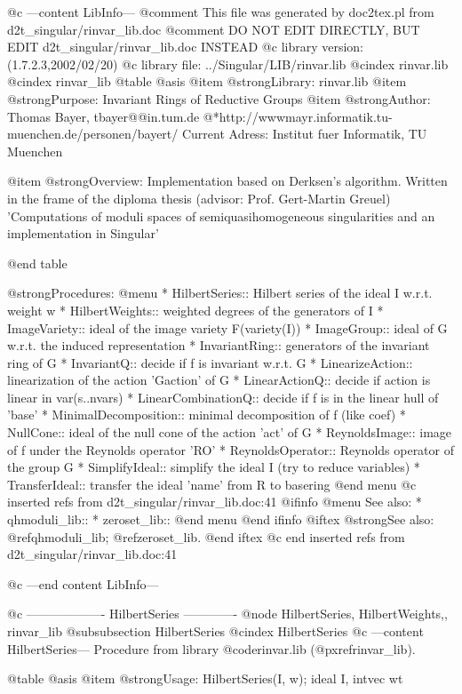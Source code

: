 @c ---content LibInfo---
@comment This file was generated by doc2tex.pl from d2t_singular/rinvar_lib.doc
@comment DO NOT EDIT DIRECTLY, BUT EDIT d2t_singular/rinvar_lib.doc INSTEAD
@c library version: (1.7.2.3,2002/02/20)
@c library file: ../Singular/LIB/rinvar.lib
@cindex rinvar.lib
@cindex rinvar_lib
@table @asis
@item @strong{Library:}
rinvar.lib
@item @strong{Purpose:}
      Invariant Rings of Reductive Groups
@item @strong{Author:}
Thomas Bayer, tbayer@@in.tum.de
@*http://wwwmayr.informatik.tu-muenchen.de/personen/bayert/
Current Adress: Institut fuer Informatik, TU Muenchen

@item @strong{Overview:}
Implementation based on Derksen's algorithm. Written in the frame of the
diploma thesis (advisor: Prof. Gert-Martin Greuel) 'Computations of moduli
spaces of semiquasihomogeneous singularities and an implementation in Singular'

@end table

@strong{Procedures:}
@menu
* HilbertSeries:: Hilbert series of the ideal I w.r.t. weight w
* HilbertWeights:: weighted degrees of the generators of I
* ImageVariety:: ideal of the image variety F(variety(I))
* ImageGroup:: ideal of G w.r.t. the induced representation
* InvariantRing:: generators of the invariant ring of G
* InvariantQ:: decide if f is invariant w.r.t. G
* LinearizeAction:: linearization of the action 'Gaction' of G
* LinearActionQ:: decide if action is linear in var(s..nvars)
* LinearCombinationQ:: decide if f is in the linear hull of 'base'
* MinimalDecomposition:: minimal decomposition of f (like coef)
* NullCone:: ideal of the null cone of the action 'act' of G
* ReynoldsImage:: image of f under the Reynolds operator 'RO'
* ReynoldsOperator:: Reynolds operator of the group G
* SimplifyIdeal:: simplify the ideal I (try to reduce variables)
* TransferIdeal:: transfer the ideal 'name' from R to basering
@end menu
@c inserted refs from d2t_singular/rinvar_lib.doc:41
@ifinfo
@menu
See also:
* qhmoduli_lib::
* zeroset_lib::
@end menu
@end ifinfo
@iftex
@strong{See also:}
@ref{qhmoduli_lib};
@ref{zeroset_lib}.
@end iftex
@c end inserted refs from d2t_singular/rinvar_lib.doc:41

@c ---end content LibInfo---

@c ------------------- HilbertSeries -------------
@node HilbertSeries, HilbertWeights,, rinvar_lib
@subsubsection HilbertSeries
@cindex HilbertSeries
@c ---content HilbertSeries---
Procedure from library @code{rinvar.lib} (@pxref{rinvar_lib}).

@table @asis
@item @strong{Usage:}
HilbertSeries(I, w); ideal I, intvec wt

